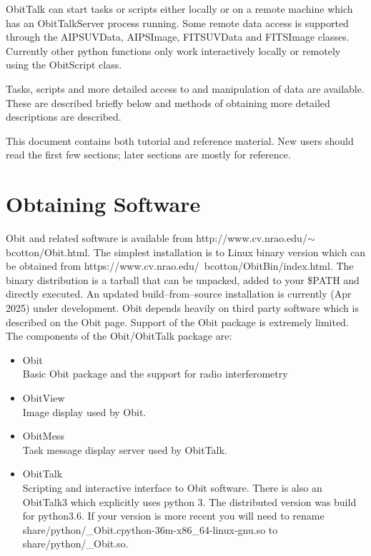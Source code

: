 \documentclass[11pt]{report}
\begin{document}
   ObitTalk can start tasks or scripts either locally or on a remote
machine  which has an ObitTalkServer process running.  
Some remote data access is supported through the AIPSUVData,
AIPSImage, FITSUVData and FITSImage classes.  
Currently other python functions only work interactively locally or
remotely using the ObitScript class.

   Tasks, scripts and more detailed access to and manipulation of data
are available.  These are described briefly below and methods of
obtaining more detailed descriptions are described.

This document contains both tutorial and reference material.
New users should read the first few sections; later sections are
mostly for reference.

\section {Obtaining Software}
Obit and related software is available from
http://www.cv.nrao.edu/$\sim$bcotton/Obit.html. 
The simplest installation is to Linux binary version which can be
obtained from  https://www.cv.nrao.edu/~bcotton/ObitBin/index.html.
The binary distribution is a tarball that can be unpacked, added to
your \$PATH and directly executed.
An updated  build--from--source installation is currently (Apr 2025)
under development.
Obit depends heavily on third party software which is described on
the Obit page.
Support of the Obit package is extremely limited.
The components of the Obit/ObitTalk package are:
\begin{itemize}
\item Obit\\
Basic Obit package and the support for radio interferometry
\item ObitView\\
Image display used by Obit.
\item ObitMess\\
Task message display server used by ObitTalk.
\item ObitTalk\\
Scripting and interactive interface to Obit software.
There is also an ObitTalk3 which explicitly uses python 3.
The distributed version was build for python3.6.
If your version is more recent you will need to rename
share/python/\_Obit.cpython-36m-x86\_64-linux-gnu.so to
share/python/\_Obit.so. 
\end{itemize}
\end{document}
